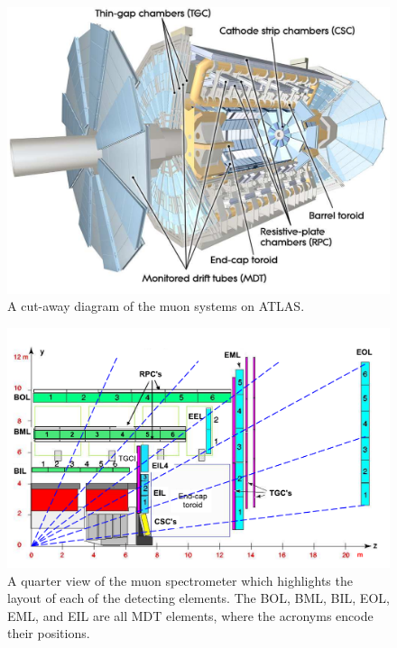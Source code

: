 \begin{figure}[hbtp]
\includegraphics[width=\fullfig]{figures/muon_overview.pdf}
\caption{A cut-away diagram of the muon systems on ATLAS.}
\label{fig:muon_overview}
\end{figure}

\begin{figure}[hbtp]
\includegraphics[width=\fullfig]{figures/muon_side_schematic.pdf}
\caption{A quarter view of the muon spectrometer which highlights the layout of each of the detecting elements. The BOL, BML, BIL, EOL, EML, and EIL are all \ac{MDT} elements, where the acronyms encode their positions.}
\label{fig:muon_side_schematic}
\end{figure}

